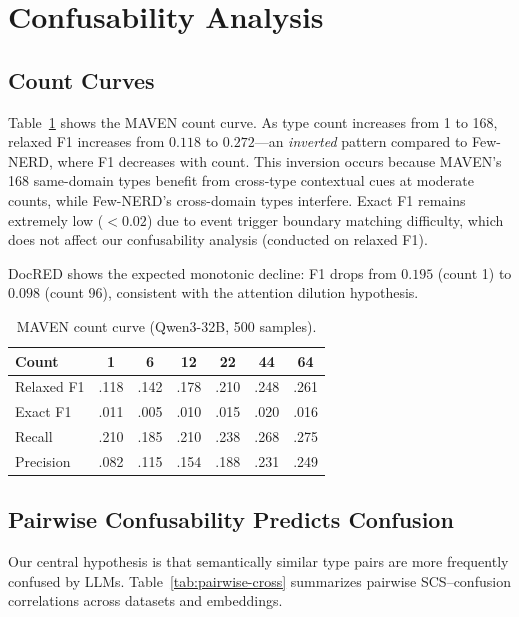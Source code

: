 \documentclass[11pt,a4paper]{article}
\begin{document}
\section{Confusability Analysis}
\label{sec:analysis}

\subsection{Count Curves}
\label{sec:count-curves}

Table~\ref{tab:maven-count} shows the MAVEN count curve.
As type count increases from 1 to 168, relaxed F1 increases from $0.118$ to $0.272$---an \emph{inverted} pattern compared to Few-NERD, where F1 decreases with count.
This inversion occurs because MAVEN's 168 same-domain types benefit from cross-type contextual cues at moderate counts, while Few-NERD's cross-domain types interfere.
Exact F1 remains extremely low ($<0.02$) due to event trigger boundary matching difficulty, which does not affect our confusability analysis (conducted on relaxed F1).

DocRED shows the expected monotonic decline: F1 drops from $0.195$ (count 1) to $0.098$ (count 96), consistent with the attention dilution hypothesis.

\begin{table}[t]
\centering
\small
\caption{MAVEN count curve (Qwen3-32B, 500 samples).}
\label{tab:maven-count}
\begin{tabular}{lcccccc}
\toprule
Count & 1 & 6 & 12 & 22 & 44 & 64 \\
\midrule
Relaxed F1 & .118 & .142 & .178 & .210 & .248 & .261 \\
Exact F1   & .011 & .005 & .010 & .015 & .020 & .016 \\
Recall     & .210 & .185 & .210 & .238 & .268 & .275 \\
Precision  & .082 & .115 & .154 & .188 & .231 & .249 \\
\bottomrule
\end{tabular}
\end{table}


\subsection{Pairwise Confusability Predicts Confusion}
\label{sec:pairwise}

Our central hypothesis is that semantically similar type pairs are more frequently confused by LLMs.
Table~\ref{tab:pairwise-cross} summarizes pairwise SCS--confusion correlations across datasets and embeddings.
\end{document}
